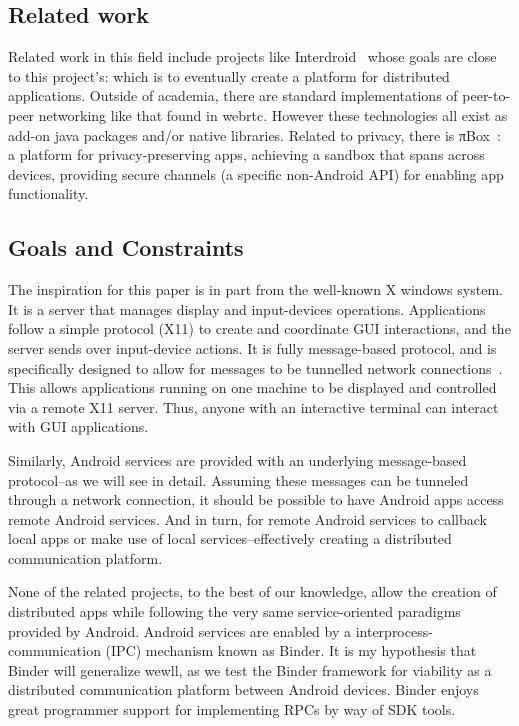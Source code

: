 \documentclass[prodmode]{acmlarge}
\begin{document}
\subsection{Related work}
Related work in this field include projects like Interdroid~\cite{Interdroid} whose goals are close to this project's: which is to eventually create a platform for distributed applications. Outside of academia, there are standard implementations of peer-to-peer networking like that found in webrtc. However these technologies all exist as add-on java packages and/or native libraries. Related to privacy, there is πBox~\cite{piBox}: a platform for privacy-preserving apps, achieving a sandbox that spans across devices, providing secure channels (a specific non-Android API) for enabling app functionality.

\subsection{Goals and Constraints}
The inspiration for this paper is in part from the well-known X windows system. It is a server that manages display and input-devices operations. Applications follow a simple protocol (X11) to create and coordinate GUI interactions, and the server sends over input-device actions. It is fully message-based protocol, and is specifically designed to allow for messages to be tunnelled network connections~\cite{X11}. This allows applications running on one machine to be displayed and controlled via a remote X11 server. Thus, anyone with an interactive terminal can interact with GUI applications.

Similarly, Android services are provided with an underlying message-based protocol--as we will see in detail. Assuming these messages can be tunneled through a network connection, it should be possible to have Android apps access remote Android services. And in turn, for remote Android services to callback local apps or make use of local services--effectively creating a distributed communication platform.

None of the related projects, to the best of our knowledge, allow the creation of distributed apps while following the very same service-oriented paradigms provided by Android. Android services are enabled by a interprocess-communication (IPC) mechanism known as Binder. It is my hypothesis that Binder will generalize wewll, as we test the Binder framework for viability as a distributed communication platform between Android devices. Binder enjoys great programmer support for implementing RPCs by way of SDK tools.
\end{document}
